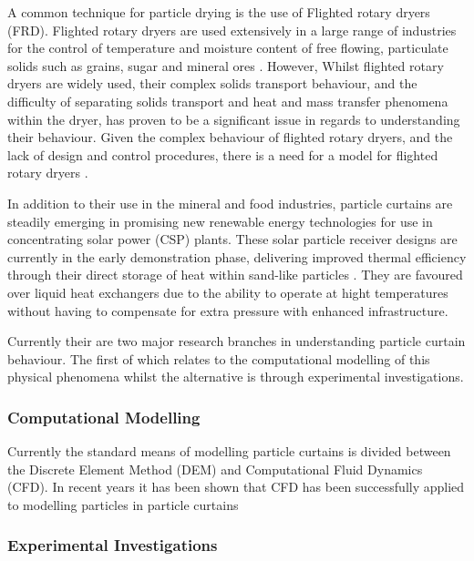 \documentclass[12pt]{article}
\newcommand{\ts}{\textsuperscript}
\newcommand{\pe}{\vspace{0.3cm}}
\newcommand{\mycite}[1]{\ts{\cite{#1}}}
\begin{document}
\pe 

A common technique for particle drying is the use of Flighted rotary dryers (FRD). Flighted rotary dryers are used extensively in a large range of industries for the control of
temperature and moisture content of free flowing, particulate solids such as grains, sugar and mineral ores \mycite{AndrewLeePhd}. However, Whilst flighted rotary dryers are widely used, their complex solids transport behaviour, and the difficulty of separating solids transport and heat and mass transfer phenomena within the dryer, has proven to be a significant issue in regards to understanding their behaviour. Given the complex behaviour of flighted rotary dryers, and the lack of design and control procedures, there is a need for a model for flighted rotary dryers \mycite{AndrewLeePhd}. 

\pe 

In addition to their use in the mineral and food industries, particle curtains are steadily emerging in promising new renewable energy technologies for use in concentrating solar power (CSP) plants. These solar particle receiver designs are currently in the early demonstration phase, delivering improved thermal efficiency through their direct storage of heat within sand-like particles \ts{\cite{christian2015system, viebahn2011potential}}. They are favoured over liquid heat exchangers due to the ability to operate at hight temperatures without having to compensate for extra pressure with enhanced infrastructure. 

\pe 

Currently their are two major research branches in understanding particle curtain behaviour. The first of which relates to the computational modelling of this physical phenomena whilst the alternative is through experimental investigations.  

\subsubsection{Computational Modelling} 

Currently the standard means of modelling particle curtains is divided between the Discrete Element Method (DEM) and Computational Fluid Dynamics (CFD). In recent years it has been shown that CFD has been successfully applied to modelling particles in particle curtains 

\subsubsection{Experimental Investigations}
\end{document}
